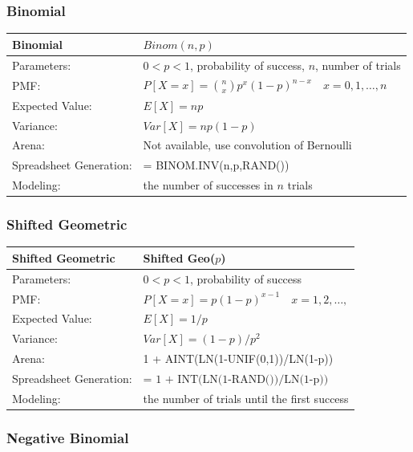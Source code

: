 \documentclass[
]{book}
\theoremstyle{definition}
\theoremstyle{definition}
\theoremstyle{definition}
\theoremstyle{definition}
\theoremstyle{remark}
\begin{document}
\hypertarget{binomial}{%
\subsubsection*{Binomial}\label{binomial}}


\begin{longtable}[]{@{}ll@{}}
\toprule
\textbf{Binomial} & \(Binom(n,p)\) \\
\midrule
\endhead
Parameters: & \(0 < p < 1\), probability of success, \(n\), number of trials \\
PMF: & \(P[X=x] = \binom{n}{x}p^{x}(1-p)^{n-x} \quad x=0,1,\ldots,n\) \\
Expected Value: & \(E[X] = np\) \\
Variance: & \(Var[X] = np(1-p)\) \\
Arena: & Not available, use convolution of Bernoulli \\
Spreadsheet Generation: & = BINOM.INV(n,p,RAND()) \\
Modeling: & the number of successes in \(n\) trials \\
\bottomrule
\end{longtable}

\hypertarget{shifted-geometric}{%
\subsubsection*{Shifted Geometric}\label{shifted-geometric}}


\begin{longtable}[]{@{}ll@{}}
\toprule
\textbf{Shifted Geometric} & Shifted Geo(\(p\)) \\
\midrule
\endhead
Parameters: & \(0 < p < 1\), probability of success \\
PMF: & \(P[X=x] = p(1-p)^{x-1} \quad x=1,2,\ldots,\) \\
Expected Value: & \(E[X] = 1/p\) \\
Variance: & \(Var[X] = (1-p)/p^2\) \\
Arena: & 1 + AINT(LN(1-UNIF(0,1))/LN(1-p)) \\
Spreadsheet Generation: & = \(\text{1 + INT(LN(1-RAND())/LN(1-p))}\) \\
Modeling: & the number of trials until the first success \\
\bottomrule
\end{longtable}

\hypertarget{negative-binomial}{%
\subsubsection*{Negative Binomial}\label{negative-binomial}}
\end{document}
